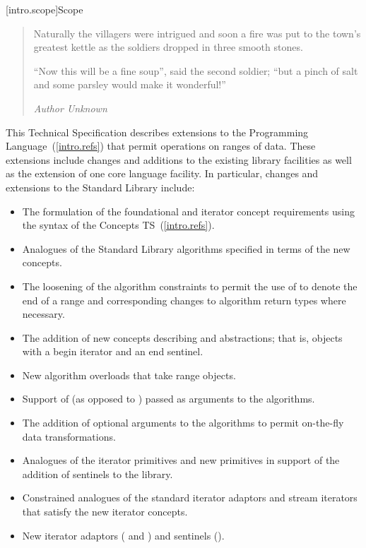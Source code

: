 [intro.scope]{Scope}

\begin{quote}
Naturally the villagers were intrigued and soon a fire was put to the town's greatest
kettle as the soldiers dropped in three smooth stones.

``Now this will be a fine soup'', said the second soldier;
``but a pinch of salt and some parsley would make it wonderful!''
\begin{flushright}
\textemdash \textit{Author Unknown}
\end{flushright}
\end{quote}

\pnum
This Technical Specification describes extensions to the \Cpp
Programming Language~(\ref{intro.refs}) that
permit operations on ranges of data. These extensions include
changes and additions to the existing library facilities as well
as the extension of one core language facility. In particular,
changes and extensions to the Standard Library include:

\begin{itemize}
\item The formulation of the foundational and iterator concept requirements
using the syntax of the Concepts TS~(\ref{intro.refs}).
\item Analogues of the Standard Library algorithms specified in terms of the new
concepts.
\item The loosening of the algorithm constraints to permit the use of
 to denote the end of a range and corresponding changes to algorithm
return types where necessary.
\item The addition of new concepts describing  and 
abstractions; that is, objects with a begin iterator and an end sentinel.
\item New algorithm overloads that take range objects.
\item Support of  (as opposed to )
passed as arguments to the algorithms.
\item The addition of optional  arguments to the algorithms to
permit on-the-fly data transformations.
\item Analogues of the iterator primitives and new primitives in support of the
addition of sentinels to the library.
\item Constrained analogues of the standard iterator adaptors and stream iterators
that satisfy the new iterator concepts.
\item New iterator adaptors ( and ) and
sentinels ().
\end{itemize}

